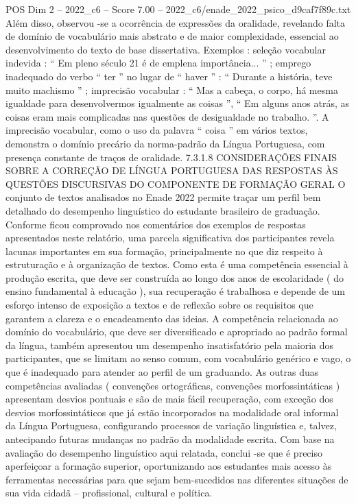 \begin{textsample}{POS Dim 2 – 2022\_c6 – Score 7.00 – 2022\_c6/enade\_2022\_psico\_d9caf7f89c.txt}
Além disso, observou -se a ocorrência de expressões da oralidade, revelando falta de domínio de vocabulário mais abstrato e de maior complexidade, essencial ao desenvolvimento do texto de base dissertativa.
Exemplos : seleção vocabular indevida : “ Em pleno século 21 é de emplena importância... ” ; emprego inadequado do verbo “ ter ” no lugar de “ haver ” : “ Durante a história, teve muito machismo ” ; imprecisão vocabular : “ Mas a cabeça, o corpo, há mesma igualdade para desenvolvermos igualmente as coisas ”, “ Em alguns anos atrás, as coisas eram mais complicadas nas questões de desigualdade no trabalho. ”.
A imprecisão vocabular, como o uso da palavra “ coisa ” em vários textos, demonstra o domínio precário da norma-padrão da Língua Portuguesa, com presença constante de traços de oralidade. 7.3.1.8 CONSIDERAÇÕES FINAIS SOBRE A CORREÇÃO DE LÍNGUA PORTUGUESA DAS RESPOSTAS ÀS QUESTÕES DISCURSIVAS DO COMPONENTE DE FORMAÇÃO GERAL O conjunto de textos analisados no Enade 2022 permite traçar um perfil bem detalhado do desempenho linguístico do estudante brasileiro de graduação.
Conforme ficou comprovado nos comentários dos exemplos de respostas apresentados neste relatório, uma parcela significativa dos participantes revela lacunas importantes em sua formação, principalmente no que diz respeito à estruturação e à organização de textos.
Como esta é uma competência essencial à produção escrita, que deve ser construída ao longo dos anos de escolaridade ( do ensino fundamental à educação ), sua recuperação é trabalhosa e depende de um esforço intenso de exposição a textos e de reflexão sobre os requisitos que garantem a clareza e o encadeamento das ideias.
A competência relacionada ao domínio do vocabulário, que deve ser diversificado e apropriado ao padrão formal da língua, também apresentou um desempenho insatisfatório pela maioria dos participantes, que se limitam ao senso comum, com vocabulário genérico e vago, o que é inadequado para atender ao perfil de um graduando.
As outras duas competências avaliadas ( convenções ortográficas, convenções morfossintáticas ) apresentam desvios pontuais e são de mais fácil recuperação, com exceção dos desvios morfossintáticos que já estão incorporados na modalidade oral informal da Língua Portuguesa, configurando processos de variação linguística e, talvez, antecipando futuras mudanças no padrão da modalidade escrita.
Com base na avaliação do desempenho linguístico aqui relatada, conclui -se que é preciso aperfeiçoar a formação superior, oportunizando aos estudantes mais acesso às ferramentas necessárias para que sejam bem-sucedidos nas diferentes situações de sua vida cidadã – profissional, cultural e política.

\end{textsample}
